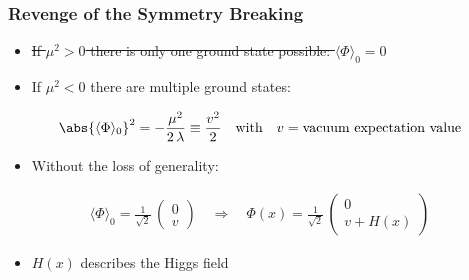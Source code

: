 \documentclass[xcolor={usenames,dvipsnames,svgnames,table}]{beamer}
\newcommand{\av}[1]{\ensuremath{\langle #1 \rangle}\xspace}
\begin{document}
\begin{frame}
    \frametitle{Revenge of the Symmetry Breaking}
    \begin{itemize}
        \item \sout{If $\mu^2>0$ there is only one ground state possible: $\av{\Phi}_0=0$}
        \item If $\mu^2<0$ there are multiple ground states:
    \end{itemize}
    \begin{gather*}
        \abs{\av{\Phi}_0}^2 = -\frac{\mu^2}{2 \, \lambda} \equiv \frac{v^2}{2} \quad \text{with} \quad v=\text{vacuum expectation value}
    \end{gather*}
    \begin{itemize}
        \item Without the loss of generality:
    \end{itemize}
    \begin{gather*}
        \av{\Phi}_0 = \frac{1}{\sqrt 2} \, \begin{pmatrix} 0 \\ v \end{pmatrix} \quad \Rightarrow \quad \Phi(x) = \frac{1}{\sqrt 2} \, \begin{pmatrix} 0 \\ v + H(x) \end{pmatrix}
    \end{gather*}
    \begin{itemize}
        \item $H(x)$ describes the Higgs field
    \end{itemize}
\end{frame}
\end{document}
